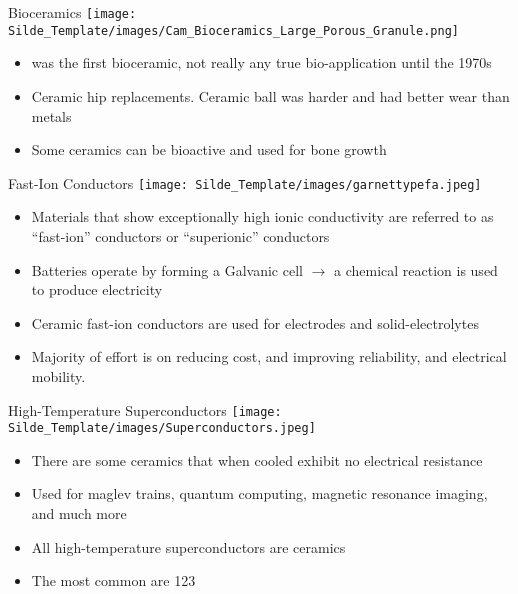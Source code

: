 \documentclass{libs/XJTLU_format}
\begin{document}
\begin{frame}{Bioceramics}
\centering
\texttt{[image: Silde\_Template/images/Cam\_Bioceramics\_Large\_Porous\_Granule.png]}

\begin{itemize}
    \item {} was the first bioceramic, not really any true bio-application until the 1970s \pause
    \item Ceramic hip replacements. Ceramic ball was harder and had better wear than metals \pause
    \item Some ceramics can be bioactive and used for bone growth
\end{itemize}
\end{frame}
    
\begin{frame}{Fast-Ion Conductors}
\centering
\texttt{[image: Silde\_Template/images/garnettypefa.jpeg]}
\begin{itemize}
    \item Materials that show exceptionally high ionic conductivity are referred to as “fast-ion” conductors or “superionic” conductors \pause
    \item Batteries operate by forming a Galvanic cell $\rightarrow$ a chemical reaction is used to produce electricity \pause
    \item Ceramic fast-ion conductors are used for electrodes and solid-electrolytes \pause
    \item Majority of effort is on reducing cost, and improving reliability, and electrical mobility. 
\end{itemize}
    
\end{frame}

\begin{frame}{High-Temperature Superconductors}
\centering
\texttt{[image: Silde\_Template/images/Superconductors.jpeg]}
\begin{itemize}
    \item There are some ceramics that when cooled exhibit no electrical resistance \pause
    \item Used for maglev trains, quantum computing, magnetic resonance imaging, and much more \pause 
    \item All high-temperature superconductors are ceramics \paui
    \item The most common are 123 
\end{itemize}
    
\end{frame}
\end{document}
